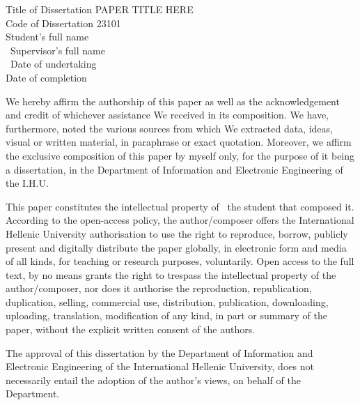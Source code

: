 \thispagestyle{empty} %

\vspace{3cm}

\begin{center}
Title of Dissertation PAPER TITLE HERE\\
Code of Dissertation 23101\\
Student’s full name \studentName\\\
Supervisor’s full name \supervisorName\\\
Date of undertaking \undertakingDate\\
Date of completion \completionDate\\
\end{center}

We hereby affirm the authorship of this paper as well as the acknowledgement and credit of whichever assistance We received in its composition. We have, furthermore, noted the various sources from which We extracted data, ideas, visual or written material, in paraphrase or exact quotation. Moreover, we affirm the exclusive composition of this paper by myself only, for the purpose of it being a dissertation, in the Department of Information and Electronic Engineering of the I.H.U.

This paper constitutes the intellectual property of \studentName\, the student that composed it. According to the open-access policy, the author/composer offers the International Hellenic University authorisation to use the right to reproduce, borrow, publicly present and digitally distribute the paper globally, in electronic form and media of all kinds, for teaching or research purposes, voluntarily. Open access to the full text, by no means grants the right to trespass the intellectual property of the author/composer, nor does it authorise the reproduction, republication, duplication, selling, commercial use, distribution, publication, downloading, uploading, translation, modification of any kind, in part or summary of the paper, without the explicit written consent of the authors.

The approval of this dissertation by the Department of Information and Electronic Engineering of the International Hellenic University, does not necessarily entail the adoption of the author’s views, on behalf of the Department.